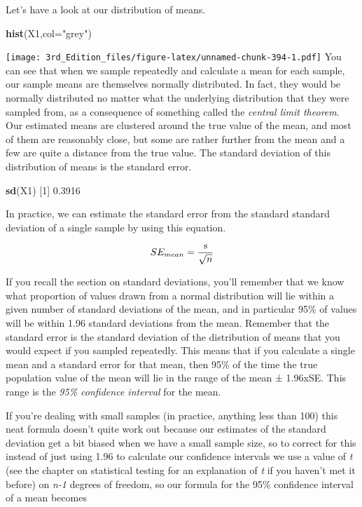 \documentclass[
]{book}
\newenvironment{Shaded}{\begin{snugshade}}{\end{snugshade}}
\newcommand{\DataTypeTok}[1]{\textcolor[rgb]{0.13,0.29,0.53}{#1}}
\newcommand{\DecValTok}[1]{\textcolor[rgb]{0.00,0.00,0.81}{#1}}
\newcommand{\FloatTok}[1]{\textcolor[rgb]{0.00,0.00,0.81}{#1}}
\newcommand{\KeywordTok}[1]{\textcolor[rgb]{0.13,0.29,0.53}{\textbf{#1}}}
\newcommand{\NormalTok}[1]{#1}
\newcommand{\StringTok}[1]{\textcolor[rgb]{0.31,0.60,0.02}{#1}}
\begin{document}
Let's have a look at our distribution of means.

\begin{Shaded}
\begin{Highlighting}[]
\KeywordTok{hist}\NormalTok{(X1,}\DataTypeTok{col=}\StringTok{"grey"}\NormalTok{)}
\end{Highlighting}
\end{Shaded}

\texttt{[image: 3rd\_Edition\_files/figure-latex/unnamed-chunk-394-1.pdf]}
You can see that when we sample repeatedly and calculate a mean for each sample, our sample means are themselves normally distributed. In fact, they would be normally distributed no matter what the underlying distribution that they were sampled from, as a consequence of something called the \emph{central limit theorem}. Our estimated means are clustered around the true value of the mean, and most of them are reasonably close, but some are rather further from the mean and a few are quite a distance from the true value. The standard deviation of this distribution of means is the standard error.

\begin{Shaded}
\begin{Highlighting}[]
\KeywordTok{sd}\NormalTok{(X1)}
\NormalTok{[}\DecValTok{1}\NormalTok{] }\FloatTok{0.3916}
\end{Highlighting}
\end{Shaded}

In practice, we can estimate the standard error from the standard standard deviation of a single sample by using this equation.

\[\Large SE_{mean} = \frac{s}{\sqrt{n}}\]

If you recall the section on standard deviations, you'll remember that we know what proportion of values drawn from a normal distribution will lie within a given number of standard deviations of the mean, and in particular 95\% of values will be within 1.96 standard deviations from the mean. Remember that the standard error is the standard deviation of the distribution of means that you would expect if you sampled repeatedly. This means that if you calculate a single mean and a standard error for that mean, then 95\% of the time the true population value of the mean will lie in the range of the mean ± 1.96xSE. This range is the \emph{95\% confidence interval} for the mean.

If you're dealing with small samples (in practice, anything less than 100) this neat formula doesn't quite work out because our estimates of the standard deviation get a bit biased when we have a small sample size, so to correct for this instead of just using 1.96 to calculate our confidence intervals we use a value of \emph{t} (see the chapter on statistical testing for an explanation of \emph{t} if you haven't met it before) on \emph{n-1} degrees of freedom, so our formula for the 95\% confidence interval of a mean becomes
\end{document}
